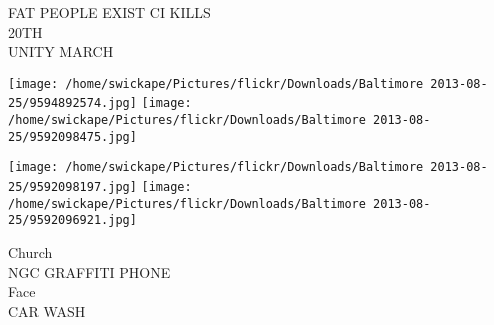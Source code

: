 \documentclass[10pt,letterpaper]{article}
\begin{document}
FAT PEOPLE EXIST CI KILLS\\
20TH\\
UNITY MARCH
\pagebreak

\texttt{[image: /home/swickape/Pictures/flickr/Downloads/Baltimore 2013-08-25/9594892574.jpg]}
\texttt{[image: /home/swickape/Pictures/flickr/Downloads/Baltimore 2013-08-25/9592098475.jpg]}

\texttt{[image: /home/swickape/Pictures/flickr/Downloads/Baltimore 2013-08-25/9592098197.jpg]}
\texttt{[image: /home/swickape/Pictures/flickr/Downloads/Baltimore 2013-08-25/9592096921.jpg]}

Church\\
NGC GRAFFITI PHONE\\
Face\\
CAR WASH
\pagebreak
\end{document}
